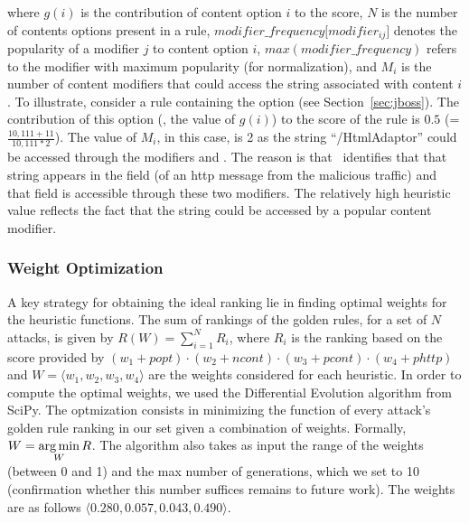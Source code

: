 \documentclass[conference]{IEEEtran}
\begin{document}
\noindent
where $g(i)$ is the contribution of content option $i$ to the score,
$N$ is the number of contents options present in a rule,
$\mathit{modifier\_frequency[modifier_{ij}}]$ denotes the popularity
of a modifier $j$ to content option $i$,
$\mathit{max(modifier\_frequency)}$ refers to the modifier with
maximum popularity (for normalization), and $M_i$ is the number of
content modifiers that could access the string associated with content
$i$.
To illustrate, consider a rule containing the option
 (see Section~\ref{sec:jboss}). The
contribution of this option (\ie{}, the value of $\mathit{g(i)}$) to
the score of the rule is $0.5$ (=$\frac{10,111+11}{10,111*2}$). The
value of $M_i$, in this case, is 2 as the string ``/HtmlAdaptor''
could be accessed through the modifiers  and
. The reason is that \tname\ identifies that
that string appears in the field  (of an http
message from the malicious traffic) and that field is accessible
through these two modifiers. The relatively high heuristic value
reflects the fact that the string could be accessed by a popular
content modifier.




\subsubsection{Weight Optimization}
\label{sec:weight-optimization}
A key strategy for obtaining the ideal ranking lie in finding optimal weights
for the heuristic functions. The sum of rankings of the golden rules, for a set of $N$ 
attacks, is given by $R(W) = \sum_{i=1}^{N}\mathit{R_i}$, where $R_i$ is the ranking based on the score provided by $(w_1 + popt) \cdot (w_2 + ncont) \cdot (w_3 + pcont) \cdot (w_4 + phttp)$ and $W = \langle{}w_1, w_2, w_3, w_4\rangle{}$ are the weights considered for each heuristic.
%
In  order to compute the optimal weights, we used the Differential Evolution 
algorithm from SciPy\cite{diff-evo-scipy}.
The optmization consists in minimizing the function of every attack's golden rule 
ranking in our set given a combination of weights. Formally, $W  = \displaystyle \mathop{\mathrm{{arg\,min}}}_W R$.
%
The algorithm also takes as input the range of the weights (between 0 and 1) 
and the max number of generations, which we set to 10 (confirmation whether 
this number suffices remains to future work). The weights are 
as follows $\langle{}0.280, 0.057, 0.043, 0.490\rangle{}$.
\end{document}
